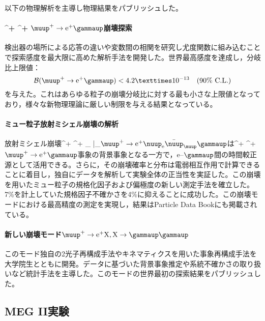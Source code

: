 \documentclass[11pt,a4paper,uplatex,dvipdfmx]{ujarticle} 		%
\newcommand{\研究課題名}{象の卵}
\newcommand{\研究機関名}{東京大学}
\newcommand{\研究代表者氏名}{内山雄祐}
\newcommand{\研究期間の最終元号年度}{6}  %
\newcommand*{\megc}{\ifmmode\muup^+ \to \mathrm{e}^+ \gammaup\else$\muup^+ \to \mathrm{e}^+ \gammaup$\fi}
\newcommand*{\rmd}{\ifmmode\muup^+ \to \mathrm{e}^+ \nuup_\mathrm{e} \bar{\nuup}_\muup \gammaup\else$\muup^+ \to \mathrm{e}^+ \nuup_\mathrm{e} \bar{\nuup}_\muup \gammaup$\fi}
\begin{document}
以下の物理解析を主導し物理結果をパブリッシュした。
\paragraph{\megc 崩壊探索}
検出器の場所による応答の違いや変数間の相関を研究し尤度関数に組み込むことで探索感度を最大限に高めた解析手法を開発した。世界最高感度を達成し，分岐比上限値：
\begin{equation}
\mathcal{B}(\megc) < 4.2×10^{-13} \quad  (90\%\ \mathrm{C.L.})
\end{equation}
を与えた\cite{TheMEG:2016wtm}。これはあらゆる粒子の崩壊分岐比に対する最も小さな上限値となっており，様々な新物理理論に厳しい制限を与える結果となっている。

\paragraph{ミュー粒子放射ミシェル崩壊の解析}
放射ミシェル崩壊\rmd は\megc 事象の背景事象となる一方で，$$--$\gammaup$間の時間較正源として活用できる。さらに，その崩壊確率と分布は電弱相互作用で計算できることに着目し，独自にデータを解析して実験全体の正当性を実証した。この崩壊を用いたミュー粒子の規格化因子および偏極度の新しい測定手法を確立した\cite{rmd1}。7\%を計上していた規格因子不確かさを4\%に抑えることに成功した。この崩壊モードにおける最高精度の測定を実現し\cite{Adam:2013gfn}，結果はParticle Data Bookにも掲載されている。

\paragraph{新しい崩壊モード$\muup^+\to\mathrm{e}^+\mathrm{X},\mathrm{X}\to\gammaup\gammaup$}
このモード独自の2光子再構成手法やキネマティクスを用いた事象再構成手法を大学院生とともに開発。データに基づいた背景事象推定や系統不確かさの取り扱いなど統計手法を主導した。このモードの世界最初の探索結果をパブリッシュした\cite{MEx2G}。


\subsection {MEG II実験}
\end{document}
